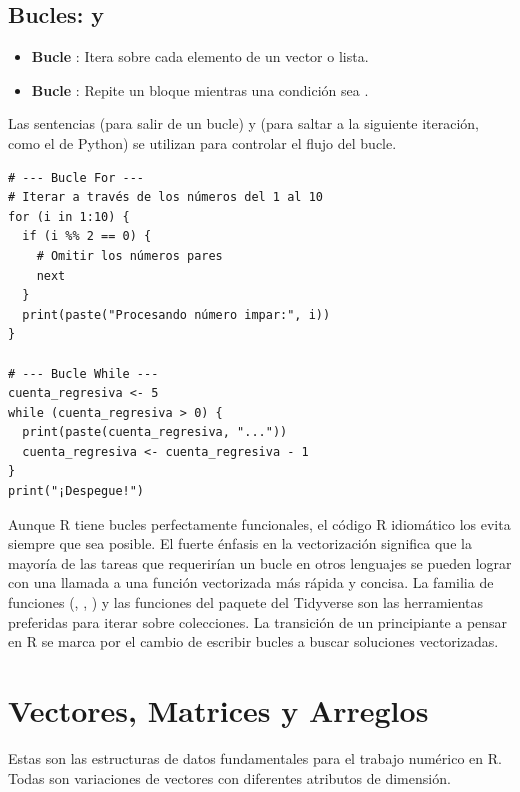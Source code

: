\subsection*{Bucles:  y }
\begin{itemize}
    \item \textbf{Bucle }: Itera sobre cada elemento de un vector o lista.
    \item \textbf{Bucle }: Repite un bloque mientras una condición sea .
\end{itemize}
Las sentencias  (para salir de un bucle) y  (para saltar a la siguiente iteración, como el  de Python) se utilizan para controlar el flujo del bucle.

\begin{example}[Bucles en R]
\text{ }\begin{verbatim}
# --- Bucle For ---
# Iterar a través de los números del 1 al 10
for (i in 1:10) {
  if (i %% 2 == 0) {
    # Omitir los números pares
    next
  }
  print(paste("Procesando número impar:", i))
}

# --- Bucle While ---
cuenta_regresiva <- 5
while (cuenta_regresiva > 0) {
  print(paste(cuenta_regresiva, "..."))
  cuenta_regresiva <- cuenta_regresiva - 1
}
print("¡Despegue!")
\end{verbatim}
\end{example}

\begin{remark}
Aunque R tiene bucles perfectamente funcionales, el código R idiomático los evita siempre que sea posible. El fuerte énfasis en la vectorización significa que la mayoría de las tareas que requerirían un bucle en otros lenguajes se pueden lograr con una llamada a una función vectorizada más rápida y concisa. La familia de funciones  (, , ) y las funciones  del paquete  del Tidyverse son las herramientas preferidas para iterar sobre colecciones. La transición de un principiante a pensar en R se marca por el cambio de escribir bucles  a buscar soluciones vectorizadas.
\end{remark}

\section{Vectores, Matrices y Arreglos}
\label{sec:r_vectors_matrices_arrays}
Estas son las estructuras de datos fundamentales para el trabajo numérico en R. Todas son variaciones de vectores con diferentes atributos de dimensión.

